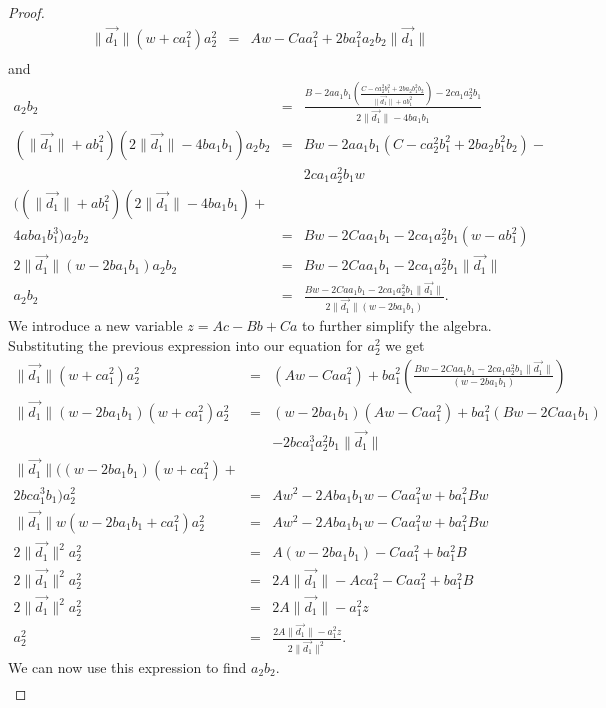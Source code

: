 \begin{proof}
\begin{eqnarray*}
\|\vec{d_1}\|(w + ca_1^2)a_2^2 & = & Aw - Caa_1^2 + 2ba_1^2a_2b_2\|\vec{d_1}\|\\
\end{eqnarray*}
and
\begin{eqnarray*}
a_2b_2 & = & \frac{B - 2aa_1b_1\left(\frac{C - ca_2^2b_1^2 + 2ba_2b_1^2b_2}{\|\vec{d_1}\| + ab_1^2}\right) - 2ca_1a_2^2b_1}{2\|\vec{d_1}\| - 4ba_1b_1}\\
(\|\vec{d_1}\| + ab_1^2)(2\|\vec{d_1}\| - 4ba_1b_1)a_2b_2 & = & Bw - 2aa_1b_1(C - ca_2^2b_1^2 + 2ba_2b_1^2b_2) - \\
 &  & 2ca_1a_2^2b_1w\\
((\|\vec{d_1}\| + ab_1^2)(2\|\vec{d_1}\| - 4ba_1b_1) + &  & \\
4aba_1b_1^3 ) a_2b_2 & = & Bw - 2Caa_1b_1 - 2ca_1a_2^2b_1(w - ab_1^2)\\
2\|\vec{d_1}\|(w - 2ba_1b_1) a_2b_2 & = & Bw - 2Caa_1b_1 - 2ca_1a_2^2b_1\|\vec{d_1}\|\\
a_2b_2 & = & \frac{Bw - 2Caa_1b_1 - 2ca_1a_2^2b_1\|\vec{d_1}\|}{2\|\vec{d_1}\|(w - 2ba_1b_1)}.
\end{eqnarray*}
We introduce a new variable $z = Ac - Bb + Ca$ to further simplify the algebra. Substituting the previous expression into our equation for $a_2^2$ we get
\begin{eqnarray*}
\|\vec{d_1}\|(w + ca_1^2)a_2^2 & = & (Aw - Caa_1^2) + ba_1^2\left(\frac{Bw - 2Caa_1b_1 - 2ca_1a_2^2b_1\|\vec{d_1}\|}{(w - 2ba_1b_1)} \right)\\
\|\vec{d_1}\|(w - 2ba_1b_1)(w + ca_1^2)a_2^2 & = & (w - 2ba_1b_1)(Aw - Caa_1^2) + ba_1^2(Bw - 2Caa_1b_1)\\
 &  &  - 2bca_1^3a_2^2b_1\|\vec{d_1}\|\\
\|\vec{d_1}\|((w - 2ba_1b_1)(w + ca_1^2)  + &  & \\
2bca_1^3b_1 )a_2^2 & = & Aw^2 - 2Aba_1b_1w - Caa_1^2w + ba_1^2Bw\\
\|\vec{d_1}\|w(w - 2ba_1b_1 + ca_1^2)a_2^2 & = & Aw^2 - 2Aba_1b_1w - Caa_1^2w + ba_1^2Bw\\
2\|\vec{d_1}\|^2a_2^2 & = & A(w - 2ba_1b_1) - Caa_1^2 + ba_1^2B\\
2\|\vec{d_1}\|^2a_2^2 & = & 2A\|\vec{d_1}\| - Aca_1^2 - Caa_1^2 + ba_1^2B\\
2\|\vec{d_1}\|^2a_2^2 & = & 2A\|\vec{d_1}\| - a_1^2z \\
a_2^2 & = & \frac{2A\|\vec{d_1}\| - a_1^2z}{2\|\vec{d_1}\|^2}.
\end{eqnarray*}
We can now use this expression to find $a_2b_2$.
\begin{eqnarray*}

\end{eqnarray*}
\end{proof}
